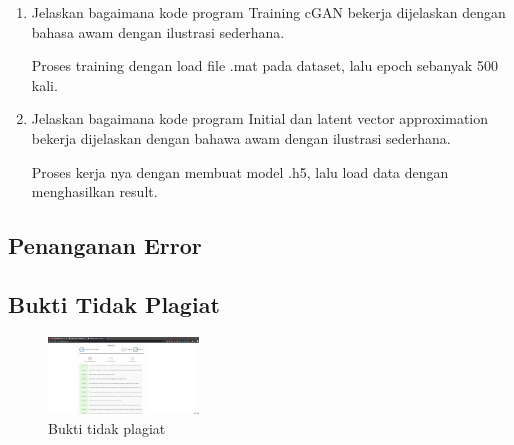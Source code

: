 \begin{enumerate}
	\item Jelaskan bagaimana kode program Training cGAN bekerja dijelaskan dengan bahasa awam dengan ilustrasi sederhana.
	\hfill\break
	
	Proses training dengan load file .mat pada dataset, lalu epoch sebanyak 500 kali.

	\item Jelaskan bagaimana kode program Initial dan latent vector approximation bekerja dijelaskan dengan bahawa awam dengan ilustrasi sederhana.
	\hfill\break
	
	Proses kerja nya dengan membuat model .h5, lalu load data dengan menghasilkan result.
	
\end{enumerate}

\subsection{Penanganan Error}

\subsection{Bukti Tidak Plagiat}
\begin{figure}[H]
	\includegraphics[width=4cm]{figures/1174057/chapter9/plagiat.jpg}
	\centering
	\caption{Bukti tidak plagiat}
\end{figure}

